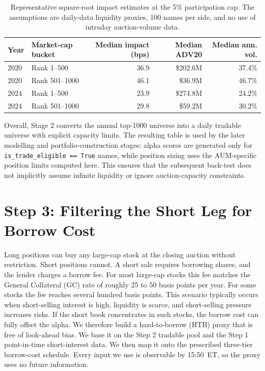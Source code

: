 \documentclass[12pt]{article}
\begin{document}
\begin{table}[htbp]
\centering
\small
\begin{tabular}{llrrr}
\hline
Year & Market-cap bucket & Median impact (bps) & Median ADV20 & Median ann. vol. \\
\hline
2020 & Rank 1--500 & 36.9 & \$202.6M & 37.4\% \\
2020 & Rank 501--1000 & 46.1 & \$36.9M & 46.7\% \\
2024 & Rank 1--500 & 23.9 & \$274.8M & 24.2\% \\
2024 & Rank 501--1000 & 29.8 & \$59.2M & 30.2\% \\
\hline
\end{tabular}
\caption{Representative square-root impact estimates at the 5\% participation cap. The assumptions are daily-data liquidity proxies, 100 names per side, and no use of intraday auction-volume data.}
\label{tab:stage2_slippage}
\end{table}

Overall, Stage 2 converts the annual top-1000 universe into a daily tradable universe with explicit capacity limits. The resulting table is used by the later modelling and portfolio-construction stages: alpha scores are generated only for \texttt{is\_trade\_eligible == True} names, while position sizing uses the AUM-specific position limits computed here. This ensures that the subsequent back-test does not implicitly assume infinite liquidity or ignore auction-capacity constraints.



\section{Step 3: Filtering the Short Leg for Borrow Cost}

Long positions can buy any large-cap stock at the closing auction without restriction. Short positions cannot. A short sale requires borrowing shares, and the lender charges a borrow fee. For most large-cap stocks this fee matches the General Collateral (GC) rate of roughly 25 to 50 basis points per year. For some stocks the fee reaches several hundred basis points. This scenario typically occurs when short-selling interest is high, liquidity is scarce, and short-selling pressure increases risks. If the short book concentrates in such stocks, the borrow cost can fully offset the alpha. We therefore build a hard-to-borrow (HTB) proxy that is free of look-ahead bias. We base it on the Step 2 tradable pool and the Step 1 point-in-time short-interest data. We then map it onto the prescribed three-tier borrow-cost schedule. Every input we use is observable by 15:50~ET, so the proxy uses no future information.
\end{document}
